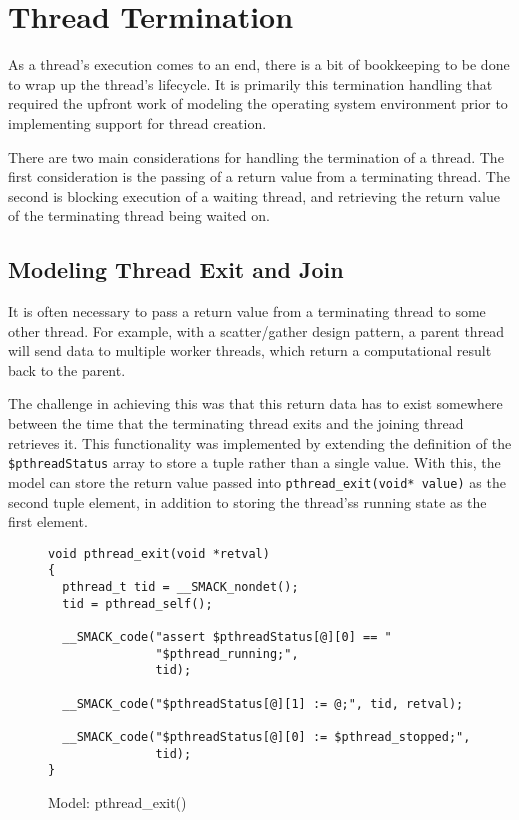 \section{Thread Termination}
As a thread's execution comes to an end, there is a bit of bookkeeping
to be done to wrap up the thread's lifecycle.  It is primarily this
termination handling that required the upfront work of modeling the
operating system environment prior to implementing support for thread
creation.

There are two main considerations for handling the termination of a
thread.  The first consideration is the passing of a return value from
a terminating thread.  The second is blocking execution of a waiting
thread, and retrieving the return value of the terminating thread
being waited on.

\subsection{Modeling Thread Exit and Join}
It is often necessary to pass a return value from a terminating thread
to some other thread.  For example, with a scatter/gather design
pattern, a parent thread will send data to multiple worker threads,
which return a computational result back to the parent.

The challenge in achieving this was that this return data has to
exist somewhere between the time that the terminating thread exits
and the joining thread retrieves it.  This functionality was
implemented by extending the definition of the
\lstinline|$pthreadStatus| array to store a tuple rather than a 
single value.  With this, the model can store the return value passed
into \lstinline|pthread_exit(void* value)| as the second tuple 
element, in addition to storing the thread'ss running state as the
first element.

\begin{figure}[!ht]
\centering
\begin{lstlisting}
void pthread_exit(void *retval)
{
  pthread_t tid = __SMACK_nondet();
  tid = pthread_self();

  __SMACK_code("assert $pthreadStatus[@][0] == "
               "$pthread_running;",
               tid);

  __SMACK_code("$pthreadStatus[@][1] := @;", tid, retval);

  __SMACK_code("$pthreadStatus[@][0] := $pthread_stopped;",
               tid);
}
\end{lstlisting}
\caption{Model: pthread\_exit()}\label{fig:pthread_exit}
\end{figure}

